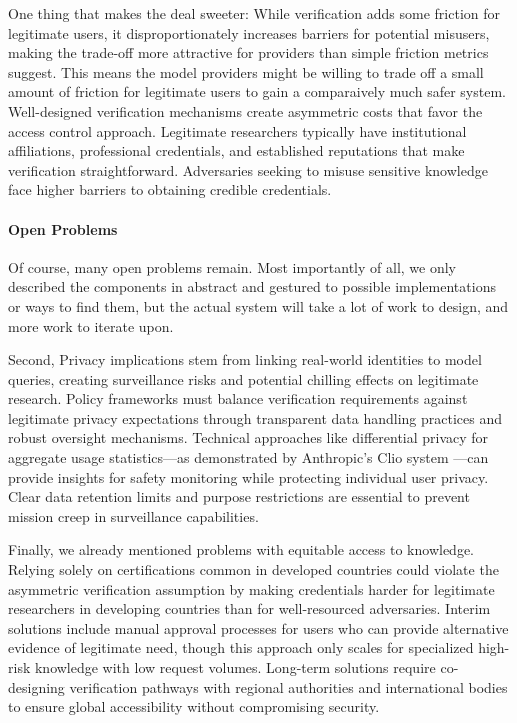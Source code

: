 \documentclass{article}
\theoremstyle{plain}
\theoremstyle{definition}
\theoremstyle{remark}
\begin{document}
One thing that makes the deal sweeter: While verification adds some friction for legitimate users, it disproportionately increases barriers for potential misusers, making the trade-off more attractive for providers than simple friction metrics suggest.
This means the model providers might be willing to trade off a small amount of friction for legitimate users to gain a comparaively much safer system.
Well-designed verification mechanisms create asymmetric costs that favor the access control approach.
Legitimate researchers typically have institutional affiliations, professional credentials, and established reputations that make verification straightforward.
Adversaries seeking to misuse sensitive knowledge face higher barriers to obtaining credible credentials.

\paragraph{Open Problems}

Of course, many open problems remain.
Most importantly of all, we only described the components in abstract and gestured to possible implementations or ways to find them, but the actual system will take a lot of work to design, and more work to iterate upon.

Second, Privacy implications stem from linking real-world identities to model queries, creating surveillance risks and potential chilling effects on legitimate research.
Policy frameworks must balance verification requirements against legitimate privacy expectations through transparent data handling practices and robust oversight mechanisms.
Technical approaches like differential privacy for aggregate usage statistics---as demonstrated by Anthropic's Clio system \cite{tamkin2024clioprivacypreservinginsightsrealworld}---can provide insights for safety monitoring while protecting individual user privacy.
Clear data retention limits and purpose restrictions are essential to prevent mission creep in surveillance capabilities.

Finally, we already mentioned problems with equitable access to knowledge.
Relying solely on certifications common in developed countries could violate the asymmetric verification assumption by making credentials harder for legitimate researchers in developing countries than for well-resourced adversaries.
Interim solutions include manual approval processes for users who can provide alternative evidence of legitimate need, though this approach only scales for specialized high-risk knowledge with low request volumes.
Long-term solutions require co-designing verification pathways with regional authorities and international bodies to ensure global accessibility without compromising security.
\end{document}
